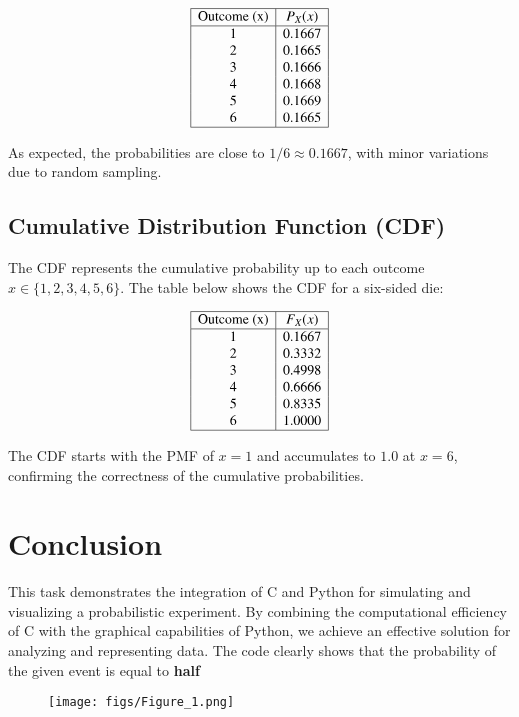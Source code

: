\documentclass[journal]{IEEEtran}
\begin{document}
\[
\begin{array}{|c|c|}
\hline
\text{Outcome (x)} & P_X(x) \\
\hline
1 & 0.1667 \\
2 & 0.1665 \\
3 & 0.1666 \\
4 & 0.1668 \\
5 & 0.1669 \\
6 & 0.1665 \\
\hline
\end{array}
\]

As expected, the probabilities are close to \(1/6 \approx 0.1667\), with minor variations due to random sampling.

\subsection*{Cumulative Distribution Function (CDF)}
The CDF represents the cumulative probability up to each outcome \(x \in \{1, 2, 3, 4, 5, 6\}\). The table below shows the CDF for a six-sided die:

\[
\begin{array}{|c|c|}
\hline
\text{Outcome (x)} & F_X(x) \\
\hline
1 & 0.1667 \\
2 & 0.3332 \\
3 & 0.4998 \\
4 & 0.6666 \\
5 & 0.8335 \\
6 & 1.0000 \\
\hline
\end{array}
\]

The CDF starts with the PMF of \(x = 1\) and accumulates to \(1.0\) at \(x = 6\), confirming the correctness of the cumulative probabilities.
\section*{Conclusion}
This task demonstrates the integration of C and Python for simulating and visualizing a probabilistic experiment. By combining the computational efficiency of C with the graphical capabilities of Python, we achieve an effective solution for analyzing and representing data. The code clearly shows that the probability of the given event is equal to \textbf{half}
\begin{figure}[h!]
   \centering
   \texttt{[image: figs/Figure\_1.png]}
\end{figure}
\end{document}
